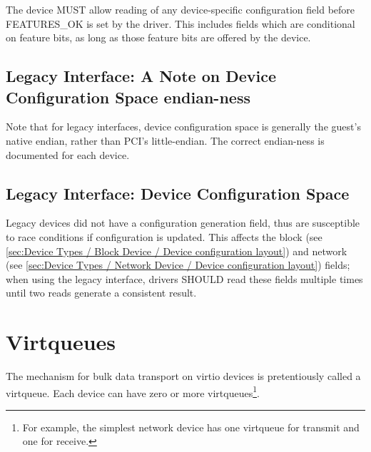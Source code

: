 The device MUST allow reading of any device-specific configuration
field before FEATURES_OK is set by the driver.  This includes fields which are
conditional on feature bits, as long as those feature bits are offered
by the device.

\subsection{Legacy Interface: A Note on Device Configuration Space endian-ness}\label{sec:Basic Facilities of a Virtio Device / Device Configuration Space / Legacy Interface: A Note on Configuration Space endian-ness}

Note that for legacy interfaces, device configuration space is generally the
guest's native endian, rather than PCI's little-endian.
The correct endian-ness is documented for each device.

\subsection{Legacy Interface: Device Configuration Space}\label{sec:Basic Facilities of a Virtio Device / Device Configuration Space / Legacy Interface: Device Configuration Space}

Legacy devices did not have a configuration generation field, thus are
susceptible to race conditions if configuration is updated.  This
affects the block  (see \ref{sec:Device Types /
Block Device / Device configuration layout}) and
network  (see \ref{sec:Device Types / Network Device /
Device configuration layout}) fields;
when using the legacy interface, drivers SHOULD
read these fields multiple times until two reads generate a consistent
result.

\section{Virtqueues}\label{sec:Basic Facilities of a Virtio Device / Virtqueues}

The mechanism for bulk data transport on virtio devices is
pretentiously called a virtqueue. Each device can have zero or more
virtqueues\footnote{For example, the simplest network device has one virtqueue for
transmit and one for receive.}.

